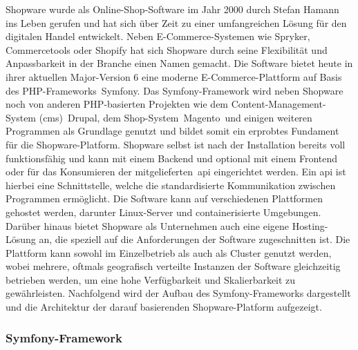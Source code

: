 Shopware wurde als Online-Shop-Software im Jahr 2000 durch Stefan Hamann ins Leben gerufen
und hat sich über Zeit zu einer umfangreichen Lösung für den digitalen Handel entwickelt.
Neben E-Commerce-Systemen wie Spryker, Commercetools oder Shopify hat sich Shopware durch seine Flexibilität und
Anpassbarkeit in der Branche einen Namen gemacht.
Die Software bietet heute in ihrer aktuellen Major-Version 6 eine moderne E-Commerce-Plattform auf Basis des
PHP-Frameworks\ \glqq Symfony\grqq.
Das Symfony-Framework wird neben Shopware noch von anderen PHP-basierten Projekten wie dem Content-Management-System
(\acrshort{cms})\ \glqq Drupal\grqq, dem Shop-System\ \glqq Magento\grqq\ und einigen weiteren
Programmen als Grundlage genutzt und bildet somit ein erprobtes Fundament für die
Shopware-Platform.
Shopware selbst ist nach der Installation bereits voll funktionsfähig und kann mit einem Backend und optional
mit einem Frontend oder für das Konsumieren der mitgelieferten\ \acrshort{api} eingerichtet werden.
Ein \acrfull{api} ist hierbei eine Schnittstelle, welche die standardisierte
Kommunikation zwischen Programmen ermöglicht.
Die Software kann auf verschiedenen Plattformen gehostet werden, darunter Linux-Server und containerisierte Umgebungen.
Darüber hinaus bietet Shopware als Unternehmen auch eine eigene Hosting-Lösung an, die speziell auf die Anforderungen
der Software zugeschnitten ist.
Die Plattform kann sowohl im Einzelbetrieb als auch als Cluster genutzt werden, wobei mehrere, oftmals geografisch
verteilte Instanzen der Software gleichzeitig betrieben werden, um eine hohe Verfügbarkeit und Skalierbarkeit zu
gewährleisten.
Nachfolgend wird der Aufbau des Symfony-Frameworks dargestellt und die Architektur der darauf basierenden
Shopware-Platform aufgezeigt.

\subsubsection{Symfony-Framework}

